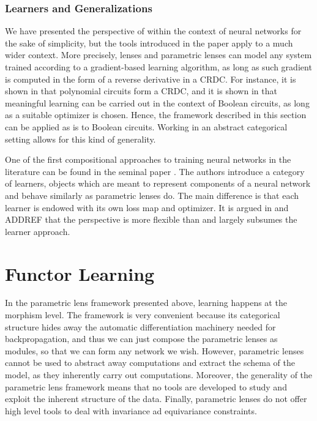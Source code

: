\documentclass[11pt,a4paper,openright,twoside]{report}
\theoremstyle{plain}
\theoremstyle{definition}
\begin{document}
\subsubsection{Learners and Generalizations}

We have presented the perspective of \cite{cruttwellDeepLearningParametric} within the context of neural networks for the sake of simplicity, but the tools introduced in the paper apply to a much wider context. More precisely, lenses and parametric lenses can model any system trained according to a gradient-based learning algorithm, as long as such gradient is computed in the form of a reverse derivative in a CRDC.  For instance, it is shown in \cite{wilsonCategoriesDifferentiablePolynomial2022} that polynomial circuits form a CRDC, and it is shown in \cite{wilsonReverseDerivativeAscent2021a} that meaningful learning can be carried out in the context of Boolean circuits, as long as a suitable optimizer is chosen. Hence, the framework described in this section can be applied as is to Boolean circuits. Working in an abstract categorical setting allows for this kind of generality. 


One of the first compositional approaches to training neural networks in the literature can be found in the seminal paper \cite{fongBackpropFunctorCompositional2019a}. The authors introduce a category of learners, objects which are meant to represent components of a neural network and behave similarly as parametric lenses do. The main difference is that each learner is endowed with its own loss map and optimizer. It is argued in \cite{cruttwellDeepLearningParametric} and ADDREF that the perspective \cite{cruttwellDeepLearningParametric} is more flexible than and largely subsumes the learner approach. 


\section{Functor Learning}

In the parametric lens framework presented above, learning happens at the morphism level. The framework is very convenient because its categorical structure hides away the automatic differentiation machinery needed for backpropagation, and thus we can just compose the parametric lenses as modules, so that we can form any network we wish. However, parametric lenses cannot be used to abstract away computations and extract the schema of the model, as they inherently carry out computations. Moreover, the generality of the parametric lens framework means that no tools are developed to study and exploit the inherent structure of the data. Finally, parametric lenses do not offer high level tools to deal with invariance ad equivariance constraints. 
\end{document}
